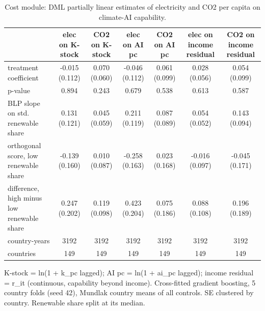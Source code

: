 \begin{table}[htbp]
\centering
\caption{Cost module: DML partially linear estimates of electricity and CO2 per capita on climate-AI capability.}
\label{tab:cost}
\begin{tabular}{lcccccc}
\toprule
 & elec on K-stock & CO2 on K-stock & elec on AI pc & CO2 on AI pc & elec on income residual & CO2 on income residual \\
\midrule
treatment coefficient & -0.015 (0.112) & 0.070 (0.060) & -0.046 (0.112) & 0.061 (0.099) & 0.028 (0.056) & 0.054 (0.099) \\
p-value & 0.894 & 0.243 & 0.679 & 0.538 & 0.613 & 0.587 \\
BLP slope on std. renewable share & 0.131 (0.121) & 0.045 (0.059) & 0.211 (0.119) & 0.087 (0.089) & 0.054 (0.052) & 0.143 (0.094) \\
orthogonal score, low renewable share & -0.139 (0.160) & 0.010 (0.087) & -0.258 (0.163) & 0.023 (0.168) & -0.016 (0.097) & -0.045 (0.171) \\
difference, high minus low renewable share & 0.247 (0.202) & 0.119 (0.098) & 0.423 (0.204) & 0.075 (0.186) & 0.088 (0.108) & 0.196 (0.189) \\
country-years & 3192 & 3192 & 3192 & 3192 & 3192 & 3192 \\
countries & 149 & 149 & 149 & 149 & 149 & 149 \\
\bottomrule
\end{tabular}
\par\smallskip\footnotesize K-stock = ln(1 + k\_pc lagged); AI pc = ln(1 + ai\_pc lagged); income residual = r\_it (continuous, capability beyond income). Cross-fitted gradient boosting, 5 country folds (seed 42), Mundlak country means of all controls. SE clustered by country. Renewable share split at its median.
\end{table}
